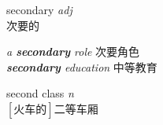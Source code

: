 \item[] {
    \lettrine{secondary}{}  
    \textit{adj} \\
    次要的
    
    \textit{a \textbf{secondary} role} 次要角色\\
    \textit{\textbf{secondary} education} 中等教育
} 

\item[] {
    \lettrine{\textsecstress second \textprimstress class}{}  
    \textit{n} \\
    $\mathrm{[\mbox{火车的}]}$二等车厢
    
} 